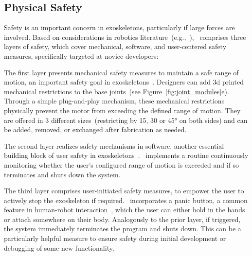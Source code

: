 \subsection{Physical Safety}
Safety is an important concern in exoskeletons, particularly if large forces are involved. 
Based on considerations in robotics literature~(e.g.,~\cite{souza_2016,zacharaki_2020}), \toolkit~comprises three layers of safety, which cover mechanical, software, and user-centered safety measures, specifically targeted at novice developers:

The first layer presents mechanical safety measures to maintain a safe range of motion, an important safety goal in exoskeletons~\cite{souza_2016}. Designers can add 3d printed mechanical restrictions to the base joints~(see Figure~\ref{fig:joint_modules}e). Through a simple plug-and-play mechanism, these mechanical restrictions physically prevent the motor from exceeding the defined range of motion. They are offered in 3 different sizes~(restricting by 15, 30 or 45° on both sides) and can be added, removed, or exchanged after fabrication as needed. 

The second layer realizes safety mechanisms in software, another essential building block of user safety in exoskeletons~\cite{souza_2016}. \toolkit~implements a routine continuously monitoring whether the user's configured range of motion is exceeded and if so terminates and shuts down the system. 

The third layer comprises user-initiated safety measures, to empower the user to actively stop the exoskeleton if required. \toolkit~incorporates a panic button, a common feature in human-robot interaction~\cite{zacharaki_2020}, which the user can either hold in the hands or attach somewhere on their body. Analogously to the prior layer, if triggered, the system immediately terminates the program and shuts down. This can be a particularly helpful measure to ensure safety during initial development or debugging of some new functionality. 

